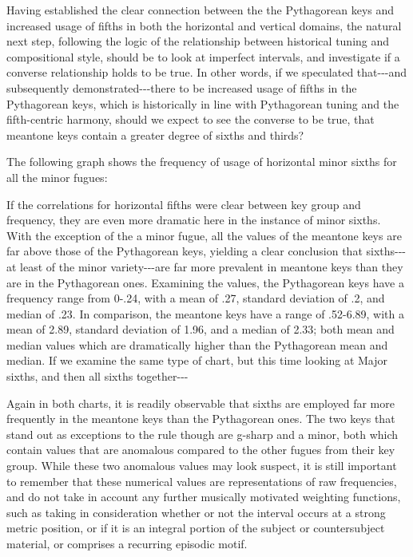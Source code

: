 Having established the clear connection between the the Pythagorean keys
and increased usage of fifths in both the horizontal and vertical
domains, the natural next step, following the logic of the relationship
between historical tuning and compositional style, should be to look at
imperfect intervals, and investigate if a converse relationship holds to
be true. In other words, if we speculated that-\/-\/-and subsequently
demonstrated-\/-\/-there to be increased usage of fifths in the
Pythagorean keys, which is historically in line with Pythagorean tuning
and the fifth-centric harmony, should we expect to see the converse to
be true, that meantone keys contain a greater degree of sixths and
thirds?

The following graph shows the frequency of usage of horizontal minor
sixths for all the minor fugues:



    \begin{center}
    \end{center}
    
    If the correlations for horizontal fifths were clear between key group
and frequency, they are even more dramatic here in the instance of minor
sixths. With the exception of the a minor fugue, all the values of the
meantone keys are far above those of the Pythagorean keys, yielding a
clear conclusion that sixths-\/-\/-at least of the minor
variety-\/-\/-are far more prevalent in meantone keys than they are in
the Pythagorean ones. Examining the values, the Pythagorean keys have a
frequency range from 0-.24, with a mean of .27, standard deviation of
.2, and median of .23. In comparison, the meantone keys have a range of
.52-6.89, with a mean of 2.89, standard deviation of 1.96, and a median
of 2.33; both mean and median values which are dramatically higher than
the Pythagorean mean and median. If we examine the same type of chart,
but this time looking at Major sixths, and then all sixths
together-\/-\/-


    \begin{center}
    \end{center}
    
    Again in both charts, it is readily observable that sixths are employed
far more frequently in the meantone keys than the Pythagorean ones. The
two keys that stand out as exceptions to the rule though are g-sharp and
a minor, both which contain values that are anomalous compared to the
other fugues from their key group. While these two anomalous values may
look suspect, it is still important to remember that these numerical
values are representations of raw frequencies, and do not take in
account any further musically motivated weighting functions, such as
taking in consideration whether or not the interval occurs at a strong
metric position, or if it is an integral portion of the subject or
countersubject material, or comprises a recurring episodic motif.

